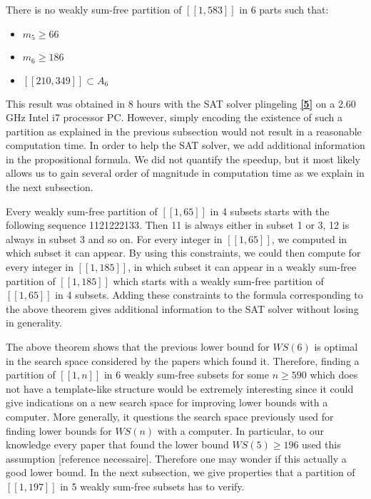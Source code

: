 \begin{computational theorem}
	There is no weakly sum-free partition of \([\![1,583]\!]\) in 6 parts such that:
	\begin{itemize}
		\item \(m_5 \ge 66\)
		\item \(m_6 \ge 186\)
		\item \([\![210,349]\!] \subset A_6\)
	\end{itemize}  
\end{computational theorem}

This result was obtained in 8 hours with the SAT solver plingeling \hyperlink{label5}{\textbf{[5]}} on a 2.60 GHz Intel i7 processor PC.
However, simply encoding the existence of such a partition as explained in the previous subsection would not result in a reasonable 
computation time. In order to help the SAT solver, we add additional information in the propositional formula. We did not quantify the 
speedup, but it most likely allows us to gain several order of magnitude in computation time as we explain in the next subsection.

\par
Every weakly sum-free partition of \([\![1,65]\!]\) in 4 subsets starts with the following sequence 1121222133. Then 11 is always 
either in subset 1 or 3, 12 is always in subset 3 and so on. For every integer in \([\![1,65]\!]\), we computed in which subset it can appear. 
By using this constraints, we could then compute for every integer in \([\![1,185]\!]\), in which subset it can appear in a weakly sum-free 
partition of  \([\![1,185]\!]\) which starts with a  weakly sum-free partition of \([\![1,65]\!]\) in 4 subsets. Adding these constraints to the 
formula corresponding to the above theorem gives additional information to the SAT solver without losing in generality.

\par
The above theorem shows that the previous lower bound for \(WS(6)\) is optimal in the search space considered by the papers which found it. 
Therefore, finding a partition of \([\![1,n]\!]\) in 6 weakly sum-free subsets for some \(n \geq 590\) which does not have a template-like structure 
would be extremely interesting since it could give indications on a new search space for improving lower bounds with a computer. More generally, 
it questions the search space previously used for finding lower bounds for \(WS(n)\) with a computer. In particular, to our knowledge every paper 
that found the lower bound \(WS(5) \geq 196\) used this assumption [reference necessaire]. Therefore one may wonder if this actually a good lower 
bound. In the next subsection, we give properties that a partition of \([\![1,197]\!]\) in 5 weakly sum-free subsets has to verify.


